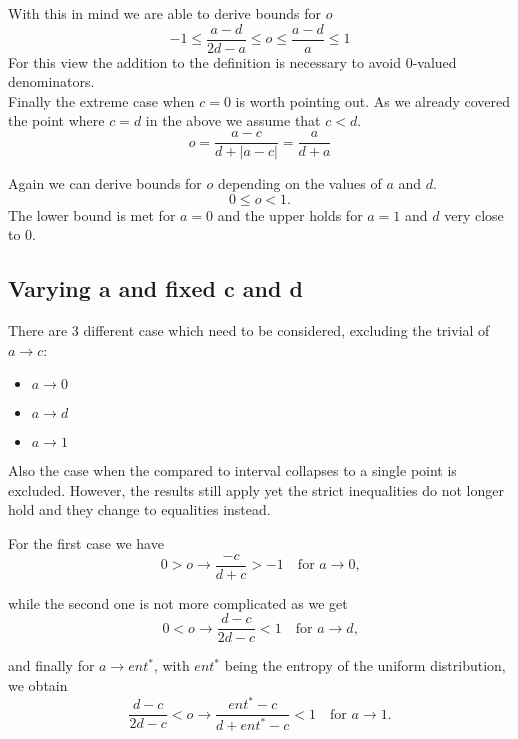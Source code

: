 \documentclass[a4paper]{article}
\begin{document}
With this in mind we are able to derive bounds for $o$ 
\begin{displaymath}
-1 \leq \frac{a-d}{2d-a} \leq o \leq \frac{a-d}{a} \leq 1
\end{displaymath}
For this view the addition to the definition is necessary to avoid 0-valued denominators.\\


Finally the extreme case when $ c = 0 $ is worth pointing out. As we already covered the point where $c = d$ in the above we assume that $c < d$.
\begin{displaymath}
 o = \frac{a-c}{d+|a-c|} = \frac{a}{d+a}
\end{displaymath}

Again we can derive bounds for $o$ depending on the values of $a$ and $d$.
\begin{displaymath}
0 \leq o < 1.
\end{displaymath}
The lower bound is met for $a=0$ and the upper holds for $a=1$ and $d$ very close to $0$.

\subsection{Varying a and fixed c and d}
There are 3 different case which need to be considered, excluding the trivial of $a \to c$:
\begin{itemize}
\item $a \to 0$
\item $a \to d$
\item $a \to 1$
\end{itemize}
Also the case when the compared to interval collapses to a single point is excluded. However, the results still apply yet the strict inequalities do not longer hold and they change to equalities instead.

For the first case we have
\begin{displaymath}
0 > o \to \frac{-c}{d+c} > -1 \quad \textrm{for } a \to 0\textrm{,}
\end{displaymath}

while the second one is not more complicated as we get
\begin{displaymath}
0 < o \to \frac{d-c}{2d-c} < 1 \quad \textrm{for } a \to d \textrm{,}
\end{displaymath}

and finally for $a \to ent^*$, with $ent^*$ being the entropy of the uniform distribution, we obtain
\begin{displaymath}
\frac{d-c}{2d-c} < o \to \frac{ent^*-c}{d+ent^*-c} < 1 \quad \textrm{for } a \to 1 \textrm{.}
\end{displaymath}
\end{document}
